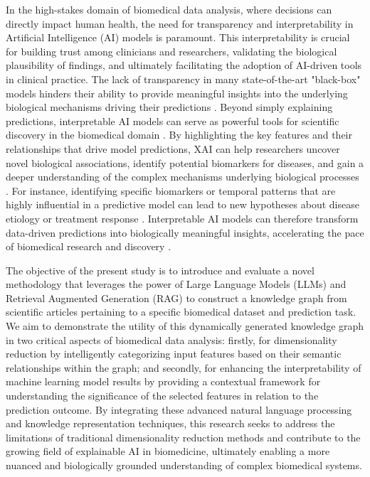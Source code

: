 \documentclass{article}
\begin{document}
In the high-stakes domain of biomedical data analysis, where decisions can directly impact human health, the need for transparency and interpretability in Artificial Intelligence (AI) models is paramount. This interpretability is crucial for building trust among clinicians and researchers, validating the biological plausibility of findings, and ultimately facilitating the adoption of AI-driven tools in clinical practice. The lack of transparency in many state-of-the-art "black-box" models hinders their ability to provide meaningful insights into the underlying biological mechanisms driving their predictions \cite{chaddad2023survey}. Beyond simply explaining predictions, interpretable AI models can serve as powerful tools for scientific discovery in the biomedical domain . By highlighting the key features and their relationships that drive model predictions, XAI can help researchers uncover novel biological associations, identify potential biomarkers for diseases, and gain a deeper understanding of the complex mechanisms underlying biological processes . For instance, identifying specific biomarkers or temporal patterns that are highly influential in a predictive model can lead to new hypotheses about disease etiology or treatment response . Interpretable AI models can therefore transform data-driven predictions into biologically meaningful insights, accelerating the pace of biomedical research and discovery \cite{chen2024applying}.

The objective of the present study is to introduce and evaluate a novel methodology that leverages the power of Large Language Models (LLMs) and Retrieval Augmented Generation (RAG) to construct a knowledge graph from scientific articles pertaining to a specific biomedical dataset and prediction task. We aim to demonstrate the utility of this dynamically generated knowledge graph in two critical aspects of biomedical data analysis: firstly, for dimensionality reduction by intelligently categorizing input features based on their semantic relationships within the graph; and secondly, for enhancing the interpretability of machine learning model results by providing a contextual framework for understanding the significance of the selected features in relation to the prediction outcome. By integrating these advanced natural language processing and knowledge representation techniques, this research seeks to address the limitations of traditional dimensionality reduction methods and contribute to the growing field of explainable AI in biomedicine, ultimately enabling a more nuanced and biologically grounded understanding of complex biomedical systems.
\end{document}
